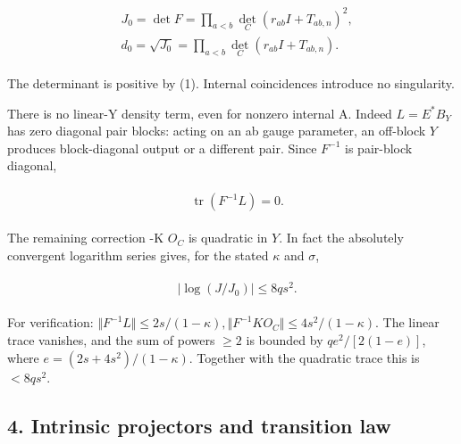 \begin{gather*}
\begin{aligned}
& J_{0}=\det  F=\prod _{a<b} \det _{C}(r_{ab} I+T_{ab,n})^{2}, \\
& d_{0}=\sqrt{J_{0}}=\prod _{a<b} \det _{C}(r_{ab} I+T_{ab,n}).
\end{aligned}\tag{11}
\end{gather*}

The determinant is positive by (1). Internal coincidences introduce no
singularity.

There is no linear-Y density term, even for nonzero internal A. Indeed
\(L=E^{*}B_{Y}\) has zero diagonal pair blocks: acting on an ab gauge
parameter, an off-block \(Y\) produces block-diagonal output or a
different pair. Since \(F^{-1}\) is pair-block diagonal,

\begin{gather*}
\begin{aligned}
& \operatorname{tr} (F^{-1}L)=0.
\end{aligned}\tag{12}
\end{gather*}

The remaining correction -K \(O_{C}\) is quadratic in \(Y\). In fact the
absolutely convergent logarithm series gives, for the stated \(\kappa\)
and \(\sigma\),

\begin{gather*}
\begin{aligned}
& \vert \log (J/J_{0})\vert  \le 8 q s^{2}.
\end{aligned}\tag{13}
\end{gather*}

For verification:
\(\Vert F^{-1}L\Vert \le 2s/(1-\kappa ), \Vert F^{-1}K O_{C}\Vert \le 4s^{2}/(1-\kappa )\).
The linear trace vanishes, and the sum of powers \(\ge 2\) is bounded by
\(q e^{2}/[2(1-e)]\), where \(e=(2s+4s^{2})/(1-\kappa )\). Together with
the quadratic trace this is \(<8q s^{2}\).

\subsection{4. Intrinsic projectors and transition
law}\label{a-intrinsic-projectors-and-transition-law}


